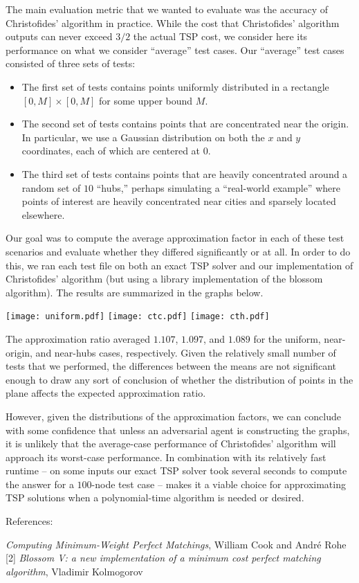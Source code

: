 \documentclass{article}
\begin{document}
The main evaluation metric that we wanted to evaluate was the accuracy of Christofides' algorithm in practice. While the cost that Christofides' algorithm outputs can never exceed $3/2$ the actual TSP cost, we consider here its performance on what we consider ``average'' test cases. Our ``average'' test cases consisted of three sets of tests: 
\begin{itemize}
	\item The first set of tests contains points uniformly distributed in a rectangle $[0, M] \times [0, M]$ for some upper bound $M$.
	\item The second set of tests contains points that are concentrated near the origin. In particular, we use a Gaussian distribution on both the $x$ and $y$ coordinates, each of which are centered at $0$.
	\item The third set of tests contains points that are heavily concentrated around a random set of $10$ ``hubs,'' perhaps simulating a ``real-world example'' where points of interest are heavily concentrated near cities and sparsely located elsewhere. 
\end{itemize}

Our goal was to compute the average approximation factor in each of these test scenarios and evaluate whether they differed significantly or at all. In order to do this, we ran each test file on both an exact TSP solver and our implementation of Christofides' algorithm (but using a library implementation of the blossom algorithm). The results are summarized in the graphs below.

\begin{center}
\texttt{[image: uniform.pdf]}
\texttt{[image: ctc.pdf]}
\texttt{[image: cth.pdf]}
\end{center}

The approximation ratio averaged $1.107$, $1.097$, and $1.089$ for the uniform, near-origin, and near-hubs cases, respectively. Given the relatively small number of tests that we performed, the differences between the means are not significant enough to draw any sort of conclusion of whether the distribution of points in the plane affects the expected approximation ratio. 

However, given the distributions of the approximation factors, we can conclude with some confidence that unless an adversarial agent is constructing the graphs, it is unlikely that the average-case performance of Christofides' algorithm will approach its worst-case performance. In combination with its relatively fast runtime -- on some inputs our exact TSP solver took several seconds to compute the answer for a $100$-node test case -- makes it a viable choice for approximating TSP solutions when a polynomial-time algorithm is needed or desired. 

\newpage

\noindent References: 
 
\noindent [1] \textit{Computing Minimum-Weight Perfect Matchings}, William Cook and Andr\'e Rohe \\
{[2]} \textit{Blossom V: a new implementation of a minimum cost perfect matching algorithm}, Vladimir Kolmogorov
\end{document}
